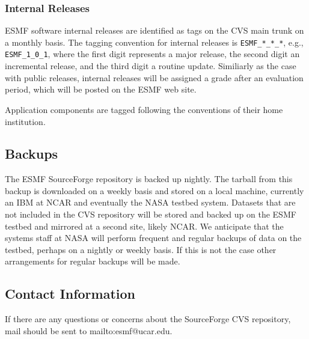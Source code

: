 \subsubsection{Internal Releases}
ESMF software internal releases are identified as tags on the CVS main trunk on a monthly basis.
The tagging convention for internal releases is
{\tt ESMF\_*\_*\_*}, e.g., {\tt ESMF\_1\_0\_1}, where the first digit represents a 
major release, the second digit an incremental release, and the third digit a routine update.
Similiarly as the case with public releases, internal releases will be assigned a grade
after an evaluation period, which will be posted on the ESMF web site.

Application components are tagged following the conventions of their
home institution.

\subsection{Backups}

The ESMF SourceForge repository is backed up nightly.  The tarball
from this backup is downloaded on a weekly basis and stored on a local
machine, currently an IBM at NCAR and eventually the NASA testbed 
system.  Datasets that are not included in the CVS repository will be 
stored and backed up on the ESMF testbed and mirrored at a second site, 
likely NCAR.  We anticipate that the systems staff at NASA will perform
frequent and regular backups of data on the testbed, perhaps on a nightly 
or weekly basis.  If this is not the case other arrangements for regular
backups will be made. 

\subsection{Contact Information}

If there are any questions or concerns about the SourceForge CVS 
repository, mail should be sent to 
{mailto:esmf@ucar.edu}.







